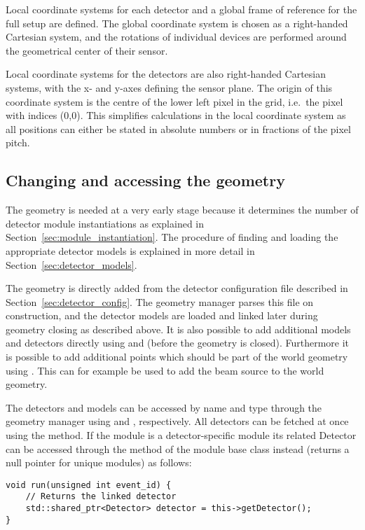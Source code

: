 Local coordinate systems for each detector and a global frame of reference for the full setup are defined.
The global coordinate system is chosen as a right-handed Cartesian system, and the rotations of individual devices are performed around the geometrical center of their sensor.

Local coordinate systems for the detectors are also right-handed Cartesian systems, with the x- and y-axes defining the sensor plane.
The origin of this coordinate system is the centre of the lower left pixel in the grid, i.e.\ the pixel with indices (0,0).
This simplifies calculations in the local coordinate system as all positions can either be stated in absolute numbers or in fractions of the pixel pitch.

\subsection{Changing and accessing the geometry}
The geometry is needed at a very early stage because it determines the number of detector module instantiations as explained in Section~\ref{sec:module_instantiation}.
The procedure of finding and loading the appropriate detector models is explained in more detail in Section~\ref{sec:detector_models}.

The geometry is directly added from the detector configuration file described in Section~\ref{sec:detector_config}.
The geometry manager parses this file on construction, and the detector models are loaded and linked later during geometry closing as described above.
It is also possible to add additional models and detectors directly using  and  (before the geometry is closed).
Furthermore it is possible to add additional points which should be part of the world geometry using .
This can for example be used to add the beam source to the world geometry.

The detectors and models can be accessed by name and type through the geometry manager using  and , respectively.
All detectors can be fetched at once using the  method.
If the module is a detector-specific module its related Detector can be accessed through the  method of the module base class instead (returns a null pointer for unique modules) as follows:
\begin{verbatim}
void run(unsigned int event_id) {
    // Returns the linked detector
    std::shared_ptr<Detector> detector = this->getDetector();
}
\end{verbatim}

